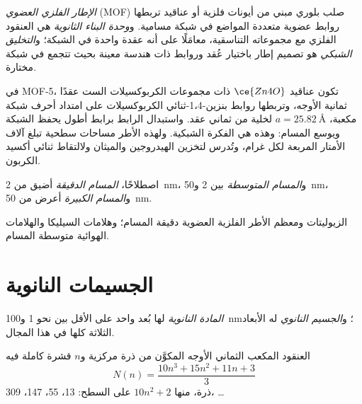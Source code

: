\begin{definition}\label{def:b3:inorganic-materials:mof}
\emph{الإطار الفلزي العضوي} (MOF)
صلب بلوري مبني من أيونات فلزية أو عناقيد تربطها روابط
عضوية متعددة المواضع في شبكة مسامية. و\emph{وحدة البناء
الثانوية} هي العنقود الفلزي مع
مجموعاته التناسقية، معامَلًا على أنه عقدة واحدة في الشبكة؛ و\emph{التخليق
الشبكي} هو تصميم إطار باختيار
عُقد وروابط ذات هندسة معينة بحيث تتجمع في شبكة مختارة.
\end{definition}

في MOF-5، تكون عناقيد $\ce{Zn4O}$ ذات مجموعات الكربوكسيلات الست عقدًا ثمانية الأوجه،
وتربطها روابط بنزين-1،4-ثنائي الكربوكسيلات على امتداد أحرف شبكة
مكعبة، $a = \qty{25.82}{\angstrom}$ لخلية من ثماني عقد. واستبدال الرابط برابط أطول
يحفظ الشبكة ويوسع المسام: وهذه هي الفكرة الشبكية. ولهذه
الأطر مساحات سطحية تبلغ آلاف الأمتار المربعة لكل غرام، وتُدرس
لتخزين الهيدروجين والميثان ولالتقاط ثنائي أكسيد الكربون.

\begin{definition}\label{def:b3:inorganic-materials:pores}
اصطلاحًا، \emph{المسام الدقيقة} أضيق من \qty{2}{nm}،
و\emph{المسام المتوسطة} بين 2 و\qty{50}{nm}، 
و\emph{المسام الكبيرة} أعرض من \qty{50}{nm}.
\end{definition}

الزيوليتات ومعظم الأطر الفلزية العضوية دقيقة المسام؛ وهلامات السيليكا والهلامات الهوائية متوسطة المسام.

\section{الجسيمات النانوية}

\begin{definition}\label{def:b3:inorganic-materials:nano}
\emph{المادة النانوية} لها بُعد واحد على الأقل بين
نحو 1 و\qty{100}{nm}؛ و\emph{الجسيم النانوي} له
الأبعاد الثلاثة كلها في هذا المجال.
\end{definition}

\begin{proposition}\label{prop:b3:inorganic-materials:magic}
العنقود المكعب الثماني الأوجه المكوَّن من ذرة مركزية و$n$ قشرة كاملة فيه
\[
  N(n) = \frac{10n^3 + 15n^2 + 11n + 3}{3}
\]
ذرة، منها $10n^2 + 2$ على السطح: 13، 55، 147، 309، \dots
\end{proposition}

